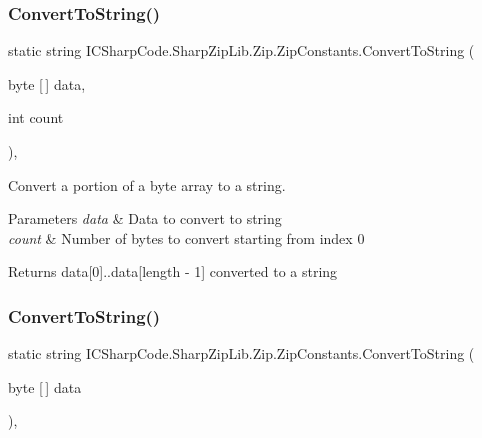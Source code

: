 \subsubsection{\texorpdfstring{Convert\+To\+String()}{ConvertToString()}\hspace{0.1cm}{\footnotesize\ttfamily [1/4]}}
{\footnotesize\ttfamily static string I\+C\+Sharp\+Code.\+Sharp\+Zip\+Lib.\+Zip.\+Zip\+Constants.\+Convert\+To\+String (\begin{DoxyParamCaption}\item[{byte \mbox{[}$\,$\mbox{]}}]{data,  }\item[{int}]{count }\end{DoxyParamCaption})\hspace{0.3cm}{\ttfamily [inline]}, {\ttfamily [static]}}



Convert a portion of a byte array to a string. 


\begin{DoxyParams}{Parameters}
{\em data} & Data to convert to string \\
\hline
{\em count} & Number of bytes to convert starting from index 0 \\
\hline
\end{DoxyParams}
\begin{DoxyReturn}{Returns}
data\mbox{[}0\mbox{]}..data\mbox{[}length -\/ 1\mbox{]} converted to a string 
\end{DoxyReturn}
\mbox{\label{class_i_c_sharp_code_1_1_sharp_zip_lib_1_1_zip_1_1_zip_constants_a992591a74674d7c5c0f40f7131828377}} 
\subsubsection{\texorpdfstring{Convert\+To\+String()}{ConvertToString()}\hspace{0.1cm}{\footnotesize\ttfamily [2/4]}}
{\footnotesize\ttfamily static string I\+C\+Sharp\+Code.\+Sharp\+Zip\+Lib.\+Zip.\+Zip\+Constants.\+Convert\+To\+String (\begin{DoxyParamCaption}\item[{byte \mbox{[}$\,$\mbox{]}}]{data }\end{DoxyParamCaption})\hspace{0.3cm}{\ttfamily [inline]}, {\ttfamily [static]}}



